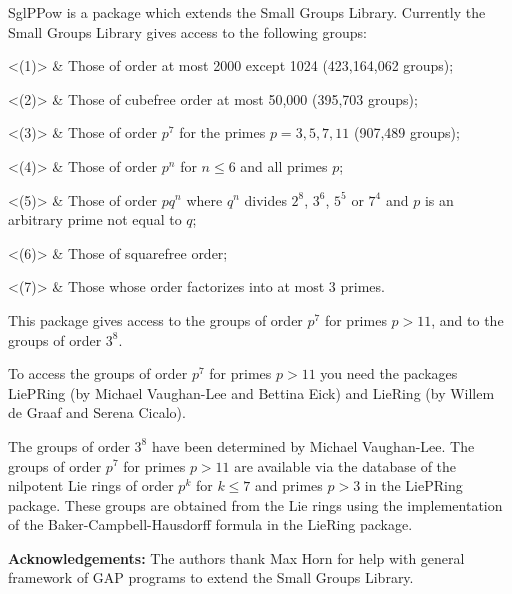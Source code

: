 

SglPPow is a package which extends the Small Groups Library. Currently the 
Small Groups Library gives access to the following groups:

\beginitems
<(1)> & Those of order at most 2000 except 1024 (423,164,062 groups);

<(2)> & Those of cubefree order at most 50,000 (395,703 groups);

<(3)> & Those of order $p^{7}$ for the primes $p=3,5,7,11$ (907,489 groups);

<(4)> & Those of order $p^{n}$ for $n\leq 6$ and all primes $p$;

<(5)> & Those of order $pq^{n}$ where $q^{n}$ divides $2^8$, $3^6$, $5^5$ or $7^4$ and
     $p$ is an arbitrary prime not equal to $q$;

<(6)> & Those of squarefree order;

<(7)> & Those whose order factorizes into at most 3 primes.
\enditems

This package gives access to the groups of order $p^{7}$ for primes 
$p>11$, and to the groups of order $3^{8}$.

To access the groups of order $p^{7}$ for primes $p>11$ you need the 
packages LiePRing (by Michael Vaughan-Lee and Bettina Eick) and LieRing
(by Willem de Graaf and Serena Cicalo).

The groups of order $3^{8}$ have been determined by Michael Vaughan-Lee.
The groups of order $p^{7}$ for primes $p>11$ are available via the 
database of the nilpotent Lie rings of order $p^{k}$ for $k\leq 7$ and
primes $p>3$ in the LiePRing package. These groups are obtained from the 
Lie rings using the implementation of the Baker-Campbell-Hausdorff formula 
in the LieRing package.

{\bf Acknowledgements:} The authors thank Max Horn for help with general 
framework of GAP programs to extend the Small Groups Library.

